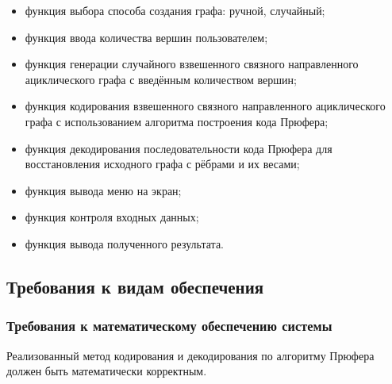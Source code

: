 \documentclass[12pt,a4paper]{article}
\begin{document}
\begin{itemize}
    \item функция выбора способа создания графа: ручной, случайный;
    \item функция ввода количества вершин пользователем;
    \item функция генерации случайного взвешенного связного направленного ациклического графа с введённым 
    количеством вершин;
    \item функция кодирования взвешенного связного направленного ациклического графа с использованием алгоритма
    построения кода Прюфера;
    \item функция декодирования последовательности кода Прюфера для восстановления исходного графа
    с рёбрами и их весами;
    \item функция вывода меню на экран;
    \item функция контроля входных данных;
    \item функция вывода полученного результата.
\end{itemize}


\subsection{Требования к видам обеспечения}
\subsubsection{Требования к математическому обеспечению системы}
Реализованный метод кодирования и декодирования по алгоритму Прюфера должен быть математически корректным.
\end{document}
